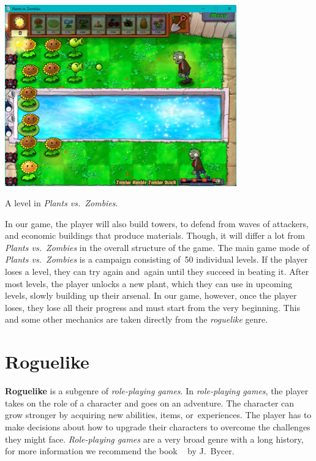\begin{center}
    \captionsetup{type=figure}
    \includegraphics[width=0.75\textwidth]{img/Plants-vs-Zombies-Fight.png}
    \caption{A level in \emph{Plants vs.\ Zombies}.}
    \label{fig:pvz-fight}
\end{center}

In our game, the player will also build towers, to defend from waves of attackers, and economic buildings that produce materials.
Though, it will differ a lot from \emph{Plants vs.\ Zombies} in the overall structure of the game.
The main game mode of \emph{Plants vs.\ Zombies} is a campaign consisting of~50 individual levels.
If the player loses a level, they can try again and~again until they succeed in beating it.
After most levels, the player unlocks a new plant, which they can use in upcoming levels, slowly building up their arsenal.
In our game, however, once the player loses, they lose all their progress and must start from the very beginning.
This and some other mechanics are taken directly from the \emph{roguelike} genre.

\section{Roguelike}

\textbf{Roguelike} is a subgenre of \emph{role-playing games}.
In \emph{role-playing games}, the player takes on the role of a character and goes on an adventure.
The character can grow stronger by acquiring new abilities, items, or~experiences.
The player has to make decisions about how to upgrade their characters to overcome the challenges they might face.
\emph{Role-playing games} are a very broad genre with a long history, for more information we recommend the book ~\cite{rpgBycer} by J.~Bycer.

